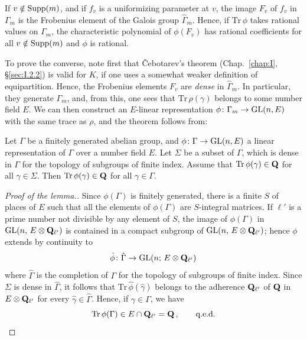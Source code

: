 If $v\notin\mathrm{Supp}(m)$, and if $f_v$ is a uniformizing parameter at $v$,
the image $F_v$ of $f_v$ in $\Gamma_m$ is the Frobenius element of the
Galois group $\hat{\Gamma}_m$.  Hence, if $\mathrm{Tr}\,\phi$ takes
rational values on $\Gamma_m$, the characteristic polynomial of
$\phi(F_v)$ has rational coefficients for all $v\notin\mathrm{Supp}(m)$ and
$\phi$ is rational.

To prove the converse, note first that \v{C}ebotarev's theorem
(Chap.~\ref{chap:I}, \S\ref{sec:I.2.2}) is valid for $K$, if one uses a
somewhat weaker definition of equipartition.  Hence, the Frobenius
elements $F_v$ are \emph{dense} in $\hat{\Gamma}_m$.  In particular, they
generate $\Gamma_m$, and, from this, one sees that
$\mathrm{Tr}\,\rho(\gamma)$ belongs to some number field $E$.  We can
then construct an $E$-linear representation
$\phi\colon \Gamma_m\to\mathrm{GL}(n,E)$ with the same trace as $\rho$, and the
theorem follows from:

\begin{lemma}
Let $\Gamma$ be a finitely generated abelian group, and
$\phi\colon \Gamma\to\mathrm{GL}(n,E)$ a linear representation of $\Gamma$ over a
number field $E$.  Let $\Sigma$ be a subset of $\Gamma$, which is dense
in $\Gamma$ for the topology of subgroups of finite index.  Assume that
$\mathrm{Tr}\,\phi(\gamma)\in\mathbf{Q}$ for all $\gamma\in\Sigma$.  Then
$\mathrm{Tr}\,\phi(\gamma)\in\mathbf{Q}$ for all $\gamma\in\Gamma$.
\end{lemma}

\begin{proof}[Proof of the lemma.]
Since $\phi(\Gamma)$ is finitely generated, there is a finite $S$ of
places of $E$ such that all the elements of $\phi(\Gamma)$ are
$S$-integral matrices.  If $\ell'$ is a prime number not divisible by any
element of $S$, the image of $\phi(\Gamma)$ in
$\mathrm{GL}(n,\,E\mathbin{\otimes}\mathbf{Q}_{\ell'})$ is contained in a compact subgroup of
$\mathrm{GL}(n,\,E\mathbin{\otimes}\mathbf{Q}_{\ell'})$; hence $\phi$ extends by continuity to
\[
\hat{\phi}\colon \hat{\Gamma} \to \mathrm{GL}(n;\,E\mathbin{\otimes}\mathbf{Q}_{\ell'})
\]
where $\hat{\Gamma}$ is the completion of $\Gamma$ for the topology of
subgroups of finite index.  Since $\Sigma$ is dense in $\hat{\Gamma}$, it
follows that $\mathrm{Tr}\,\hat{\phi}(\hat{\gamma})$ belongs to the
adherence $\mathbf{Q}_{\ell'}$ of $\mathbf{Q}$ in $E\mathbin{\otimes}\mathbf{Q}_{\ell'}$ for every
$\hat{\gamma}\in\hat{\Gamma}$.  Hence, if $\gamma\in\Gamma$, we have
\[
\mathrm{Tr}\,\phi(\Gamma) \in E\cap\mathbf{Q}_{\ell'} = \mathbf{Q}\,,
\qquad\text{q.e.d.}
\]
\end{proof}

